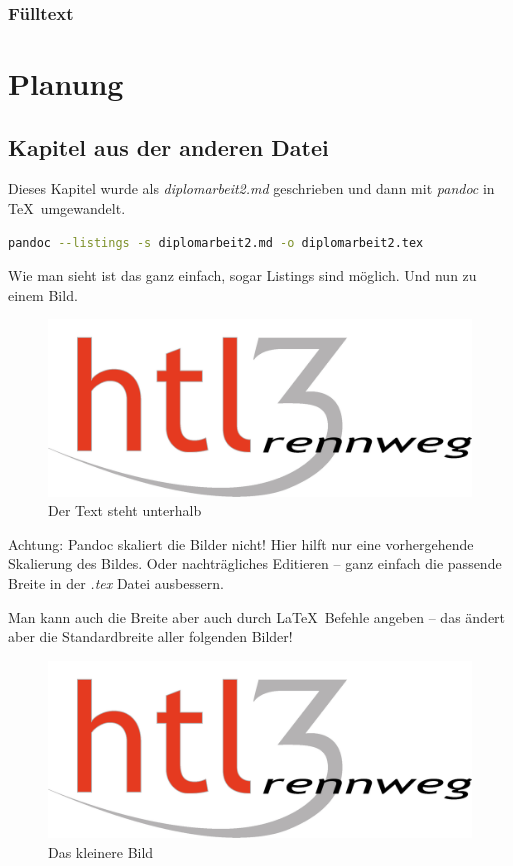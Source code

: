 \documentclass[a4paper,ngerman,naustrian,DIV=12,BCOR=1cm]{scrbook}
\begin{document}
\subsection{Fülltext}

\Blindtext


\chapter{Planung}

\section{Kapitel aus der anderen
Datei}\label{kapitel-aus-der-anderen-datei}

Dieses Kapitel wurde als \emph{diplomarbeit2.md} geschrieben und dann
mit \emph{pandoc} in \TeX~umgewandelt.

\begin{lstlisting}[language=bash]
pandoc --listings -s diplomarbeit2.md -o diplomarbeit2.tex 
\end{lstlisting}

Wie man sieht ist das ganz einfach, sogar Listings sind möglich. Und nun
zu einem Bild.

\begin{figure}[htbp]
\centering
\includegraphics{HTL3RLogo.png}
\caption{Der Text steht unterhalb}
\end{figure}

Achtung: Pandoc skaliert die Bilder nicht! Hier hilft nur eine
vorhergehende Skalierung des Bildes. Oder nachträgliches Editieren --
ganz einfach die passende Breite in der \emph{.tex} Datei ausbessern.

Man kann auch die Breite aber auch durch La\TeX~Befehle angeben -- das
ändert aber die Standardbreite aller folgenden Bilder!


\begin{figure}[htbp]
\centering
\includegraphics{HTL3RLogo.png}
\caption{Das kleinere Bild}
\end{figure}
\end{document}
